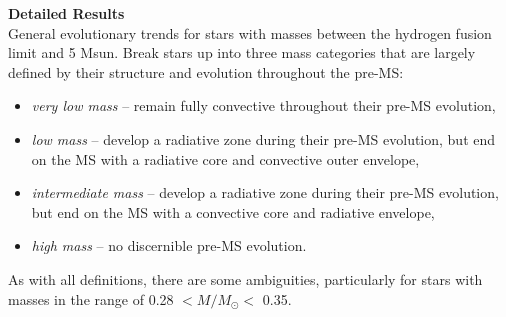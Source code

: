 \textbf{Detailed Results} \\
General evolutionary trends for stars with masses between the hydrogen fusion limit and 5 Msun. Break stars up into three mass categories that are largely defined by their structure and evolution throughout the pre-MS: 
\begin{itemize}
 \item {\it very low mass} -- remain fully convective throughout their pre-MS evolution,
 \item {\it low mass} -- develop a radiative zone during their pre-MS evolution, but end on the MS with a radiative core and convective outer envelope,
 \item {\it intermediate mass} -- develop a radiative zone during their pre-MS evolution, but end on the MS with a convective core and radiative envelope,
 \item {\it high mass} -- no discernible pre-MS evolution.
\end{itemize}
As with all definitions, there are some ambiguities, particularly for stars with masses in the range of 0.28 $< M / M_{\odot} <$ 0.35.